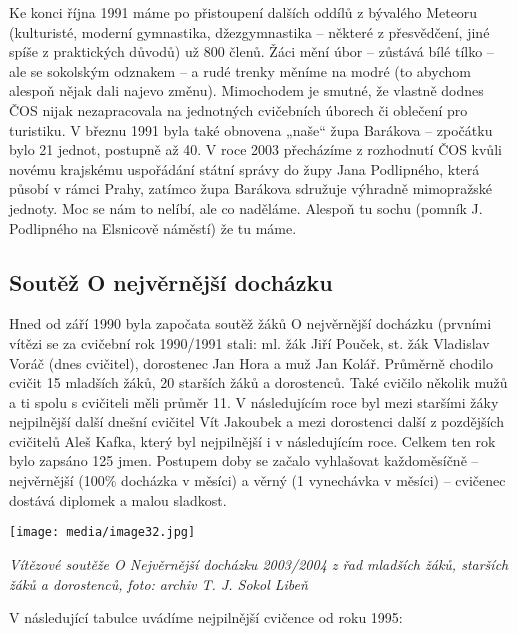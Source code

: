 Ke konci října 1991 máme po přistoupení dalších oddílů z bývalého
Meteoru (kulturisté, moderní gymnastika, džezgymnastika -- některé z
přesvědčení, jiné spíše z praktických důvodů) už 800 členů. Žáci mění
úbor -- zůstává bílé tílko -- ale se sokolským odznakem -- a rudé trenky
měníme na modré (to abychom alespoň nějak dali najevo změnu). Mimochodem
je smutné, že vlastně dodnes ČOS nijak nezapracovala na jednotných
cvičebních úborech či oblečení pro turistiku. V březnu 1991 byla také
obnovena „naše`` župa Barákova -- zpočátku bylo 21 jednot, postupně až
40. V roce 2003 přecházíme z rozhodnutí ČOS kvůli novému krajskému
uspořádání státní správy do župy Jana Podlipného, která působí v rámci
Prahy, zatímco župa Barákova sdružuje výhradně mimopražské jednoty. Moc
se nám to nelíbí, ale co naděláme. Alespoň tu sochu (pomník J.
Podlipného na Elsnicově náměstí) že tu máme.

\subsection{Soutěž O nejvěrnější
docházku}\label{soutux11bux17e-o-nejvux11brnux11bjux161uxed-dochuxe1zku}

Hned od září 1990 byla započata soutěž žáků O nejvěrnější docházku
(prvními vítězi se za cvičební rok 1990/1991 stali: ml. žák Jiří Pouček,
st. žák Vladislav Voráč (dnes cvičitel), dorostenec Jan Hora a muž Jan
Kolář. Průměrně chodilo cvičit 15 mladších žáků, 20 starších žáků a
dorostenců. Také cvičilo několik mužů a ti spolu s cvičiteli měli průměr
11. V následujícím roce byl mezi staršími žáky nejpilnější další dnešní
cvičitel Vít Jakoubek a mezi dorostenci další z pozdějších cvičitelů
Aleš Kafka, který byl nejpilnější i v následujícím roce. Celkem ten rok
bylo zapsáno 125 jmen. Postupem doby se začalo vyhlašovat každoměsíčně
-- nejvěrnější (100\% docházka v měsíci) a věrný (1 vynechávka v měsíci)
-- cvičenec dostává diplomek a malou sladkost.

\texttt{[image: media/image32.jpg]}

\emph{Vítězové soutěže O Nejvěrnější docházku 2003/2004 z řad mladších
žáků, starších žáků a dorostenců,} \emph{foto: archiv T. J. Sokol Libeň}

V následující tabulce uvádíme nejpilnější cvičence od roku 1995:

